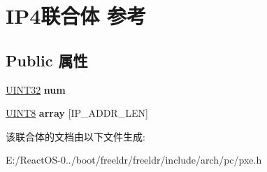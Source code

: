 \hypertarget{union_i_p4}{}\section{I\+P4联合体 参考}
\label{union_i_p4}
\subsection*{Public 属性}
\begin{DoxyCompactItemize}
\item 
\mbox{\label{union_i_p4_a8b95133a2e1beeadfbdb2d280e0777c9}} 
\hyperlink{_processor_bind_8h_ae1e6edbbc26d6fbc71a90190d0266018}{U\+I\+N\+T32} {\bfseries num}
\item 
\mbox{\label{union_i_p4_a54c0ea5f54ce5ce1f1ff9ccf5e78aa94}} 
\hyperlink{_processor_bind_8h_ab27e9918b538ce9d8ca692479b375b6a}{U\+I\+N\+T8} {\bfseries array} \mbox{[}I\+P\+\_\+\+A\+D\+D\+R\+\_\+\+L\+EN\mbox{]}
\end{DoxyCompactItemize}


该联合体的文档由以下文件生成\+:\begin{DoxyCompactItemize}
\item 
E\+:/\+React\+O\+S-\/0../boot/freeldr/freeldr/include/arch/pc/pxe.\+h\end{DoxyCompactItemize}
